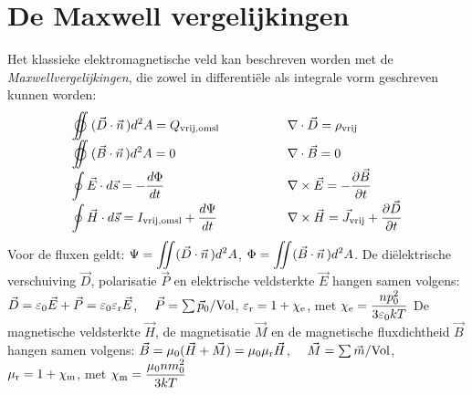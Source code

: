 \section{De Maxwell vergelijkingen}
Het klassieke elektromagnetische veld kan beschreven worden met de
{\it Maxwellvergelijkingen}, die zowel in differenti\"ele als integrale vorm
geschreven kunnen worden:
\[
\begin{array}{ll}
\displaystyle\oiint(\vec{D}\cdot\vvec{n})d^2A=Q_{\rm vrij,omsl}~~~~~~~~~~~~~
 &\displaystyle\nabla\cdot\vec{D}=\rho_{\rm vrij}\\
\displaystyle\oiint(\vec{B}\cdot\vvec{n})d^2A=0
 &\displaystyle\nabla\cdot\vec{B}=0\\
\displaystyle\oint\vec{E}\cdot d\vec{s}=-\frac{d\Phi}{dt}
 &\displaystyle\nabla\times\vec{E}=-\Q{\vec{B}}{t}\\
\displaystyle\oint\vec{H}\cdot d\vec{s}=I_{\rm vrij,omsl}+\frac{d\Psi}{dt}
 &\displaystyle\nabla\times\vec{H}=\vec{J}_{\rm vrij}+\Q{\vec{D}}{t}
\end{array}
\]
Voor de fluxen geldt: $\displaystyle \Psi=\int\hspace{-1.5ex}\int(\vec{D}\cdot\vec{n}\,)d^2A$,
$\displaystyle\Phi=\int\hspace{-1.5ex}\int(\vec{B}\cdot\vec{n}\,)d^2A$.
\npar
De di\"elektrische verschuiving $\vec{D}$, polarisatie $\vec{P}$ en
elektrische veldsterkte $\vec{E}$ hangen samen volgens:
\npar
$\vec{D}=\varepsilon_0\vec{E}+\vec{P}=\varepsilon_0\varepsilon_{\rm r}\vec{E}$,~~
$\vec{P}=\sum\vec{p}_0/{\rm Vol}$, $\varepsilon_{\rm r}=1+\chi_{\rm e}$, met
$\displaystyle\chi_{\rm e}=\frac{np_0^2}{3\varepsilon_0kT}$
\npar
De magnetische veldsterkte $\vec{H}$, de magnetisatie $\vec{M}$ en de
magnetische fluxdichtheid $\vec{B}$ hangen samen volgens:
\npar
$\vec{B}=\mu_0(\vec{H}+\vec{M})=\mu_0\mu_{\rm r}\vec{H}$,~~
$\vec{M}=\sum\vec{m}/{\rm Vol}$, $\mu_{\rm r}=1+\chi_{\rm m}$, met
$\displaystyle\chi_{\rm m}=\frac{\mu_0nm_0^2}{3kT}$

